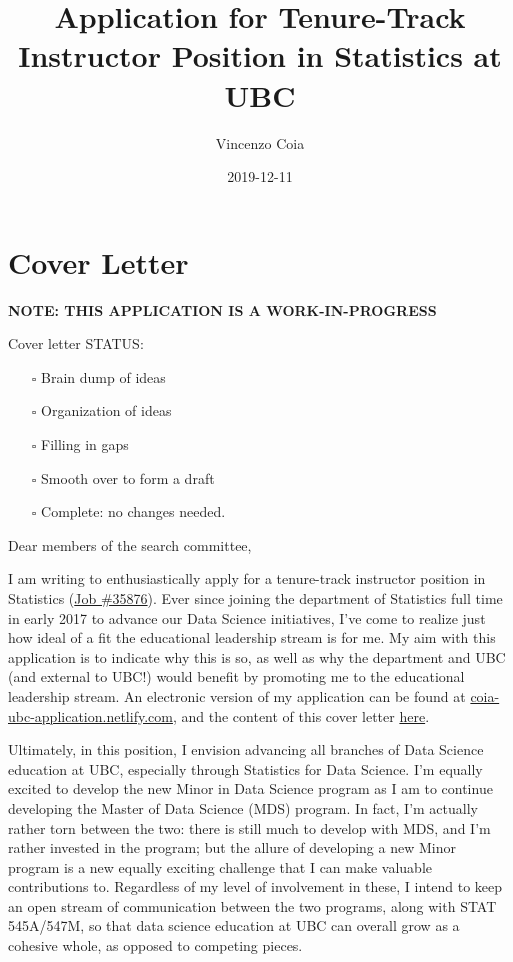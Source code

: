 \documentclass[]{article}
\title{Application for Tenure-Track Instructor Position in Statistics at UBC}
\author{Vincenzo Coia}
\date{2019-12-11}
\providecommand{\tightlist}{%
  \setlength{\itemsep}{0pt}\setlength{\parskip}{0pt}}
\begin{document}
\maketitle

{
\hypersetup{linkcolor=black}
\setcounter{tocdepth}{2}
\tableofcontents
}
\hypertarget{cover-letter}{%
\section{Cover Letter}\label{cover-letter}}

\textbf{NOTE: THIS APPLICATION IS A WORK-IN-PROGRESS}

Cover letter STATUS:

\begin{itemize}
\tightlist
\item[$\square$]
  Brain dump of ideas
\item[$\square$]
  Organization of ideas
\item[$\square$]
  Filling in gaps
\item[$\square$]
  Smooth over to form a draft
\item[$\square$]
  Complete: no changes needed.
\end{itemize}

Dear members of the search committee,

I am writing to enthusiastically apply for a tenure-track instructor position in Statistics (\href{https://www.stat.ubc.ca/three-tenure-track-instructor-positions-statistics-35876}{Job \#35876}). Ever since joining the department of Statistics full time in early 2017 to advance our Data Science initiatives, I've come to realize just how ideal of a fit the educational leadership stream is for me. My aim with this application is to indicate why this is so, as well as why the department and UBC (and external to UBC!) would benefit by promoting me to the educational leadership stream. An electronic version of my application can be found at \href{https://coia-ubc-application.netlify.com/}{coia-ubc-application.netlify.com}, and the content of this cover letter \href{}{here}.

Ultimately, in this position, I envision advancing all branches of Data Science education at UBC, especially through Statistics for Data Science. I'm equally excited to develop the new Minor in Data Science program as I am to continue developing the Master of Data Science (MDS) program. In fact, I'm actually rather torn between the two: there is still much to develop with MDS, and I'm rather invested in the program; but the allure of developing a new Minor program is a new equally exciting challenge that I can make valuable contributions to. Regardless of my level of involvement in these, I intend to keep an open stream of communication between the two programs, along with STAT 545A/547M, so that data science education at UBC can overall grow as a cohesive whole, as opposed to competing pieces.
\end{document}
